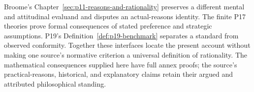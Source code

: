 Broome's Chapter~\ref{sec:p11-reasons-and-rationality} preserves a
different mental and attitudinal evaluand and disputes an actual-reasons
identity. The finite P17 theories prove formal consequences of stated
preference and strategic assumptions. P19's
Definition~\ref{def:p19-benchmark} separates a standard from observed
conformity. Together these interfaces locate the present account without
making one source's normative criterion a universal definition of
rationality. The mathematical consequences supplied here have full
annex proofs; the source's practical-reasons, historical, and explanatory
claims retain their argued and attributed philosophical standing.

